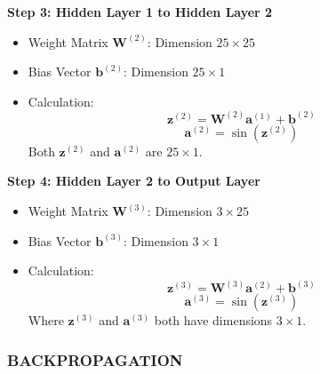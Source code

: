 \documentclass{ioereport}
\begin{document}
\textbf{Step 3: Hidden Layer 1 to Hidden Layer 2}
\begin{itemize}
  \item Weight Matrix $\mathbf{W}^{(2)}$: Dimension $25 \times 25$
  \item Bias Vector $\mathbf{b}^{(2)}$: Dimension $25 \times 1$
  \item Calculation:
  \[
  \mathbf{z}^{(2)} = \mathbf{W}^{(2)} \mathbf{a}^{(1)} + \mathbf{b}^{(2)}
  \]
  \[
  \mathbf{a}^{(2)} = \sin(\mathbf{z}^{(2)})
  \]
  Both $\mathbf{z}^{(2)}$ and $\mathbf{a}^{(2)}$ are $25 \times 1$.
\end{itemize}

\textbf{Step 4: Hidden Layer 2 to Output Layer}
\begin{itemize}
  \item Weight Matrix $\mathbf{W}^{(3)}$: Dimension $3 \times 25$
  \item Bias Vector $\mathbf{b}^{(3)}$: Dimension $3 \times 1$
  \item Calculation:
  \[
  \mathbf{z}^{(3)} = \mathbf{W}^{(3)} \mathbf{a}^{(2)} + \mathbf{b}^{(3)}
  \]
  \[
  \mathbf{a}^{(3)} = \sin(\mathbf{z}^{(3)})
  \]
  Where $\mathbf{z}^{(3)}$ and $\mathbf{a}^{(3)}$ both have dimensions $3 \times 1$.
\end{itemize}


\subsubsection*{\MakeUppercase{Backpropagation}}
\end{document}
